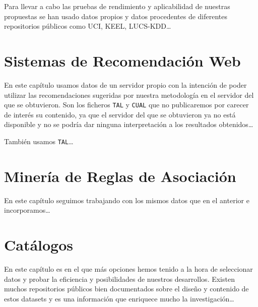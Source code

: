 Para llevar a cabo las pruebas de rendimiento y aplicabilidad de nuestras propuestas se han usado datos propios y datos procedentes de diferentes repositorios públicos como UCI, KEEL, LUCS-KDD\ldots





\section{Sistemas de Recomendación Web}
En este capítulo usamos datos de un servidor propio con la intención de poder utilizar las recomendaciones sugeridas por nuestra metodología en el servidor del que se obtuvieron. Son los ficheros \texttt{TAL} y \texttt{CUAL} que no publicaremos por carecer de interés su contenido, ya que el servidor del que se obtuvieron ya no está disponible y no se podría dar ninguna interpretación a los resultados obtenidos\ldots

También usamos \texttt{TAL}\ldots




\section{Minería de Reglas de Asociación}
En este capítulo seguimos trabajando con los mismos datos que en el anterior e incorporamos\ldots




\section{Catálogos}
En este capítulo es en el que más opciones hemos tenido a la hora de seleccionar datos y probar la eficiencia y posibilidades de nuestros desarrollos. Existen muchos repositorios públicos bien documentados sobre el diseño y contenido de estos datasets y es una información que enriquece mucho la investigación\ldots





